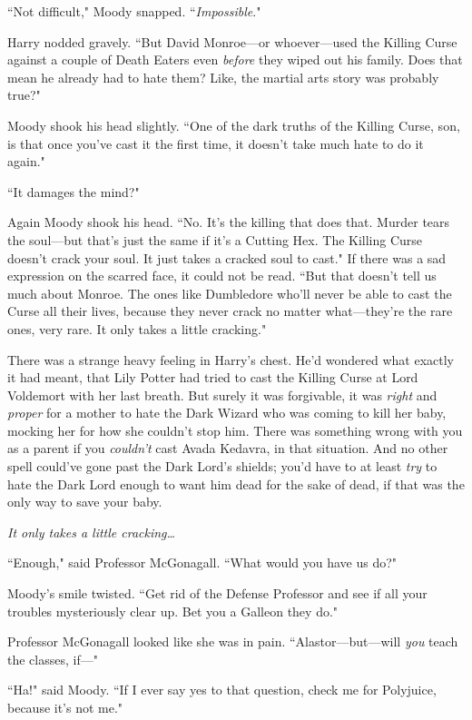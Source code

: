 ``Not difficult," Moody snapped. ``\emph{Impossible}."

Harry nodded gravely. ``But David Monroe—or whoever—used the Killing Curse against a couple of Death Eaters even \emph{before} they wiped out his family. Does that mean he already had to hate them? Like, the martial arts story was probably true?"

Moody shook his head slightly. ``One of the dark truths of the Killing Curse, son, is that once you've cast it the first time, it doesn't take much hate to do it again."

``It damages the mind?"

Again Moody shook his head. ``No. It's the killing that does that. Murder tears the soul—but that's just the same if it's a Cutting Hex. The Killing Curse doesn't crack your soul. It just takes a cracked soul to cast." If there was a sad expression on the scarred face, it could not be read. ``But that doesn't tell us much about Monroe. The ones like Dumbledore who'll never be able to cast the Curse all their lives, because they never crack no matter what—they're the rare ones, very rare. It only takes a little cracking."

There was a strange heavy feeling in Harry's chest. He'd wondered what exactly it had meant, that Lily Potter had tried to cast the Killing Curse at Lord Voldemort with her last breath. But surely it was forgivable, it was \emph{right} and \emph{proper} for a mother to hate the Dark Wizard who was coming to kill her baby, mocking her for how she couldn't stop him. There was something wrong with you as a parent if you \emph{couldn't} cast Avada Kedavra, in that situation. And no other spell could've gone past the Dark Lord's shields; you'd have to at least \emph{try} to hate the Dark Lord enough to want him dead for the sake of dead, if that was the only way to save your baby.

\emph{It only takes a little cracking{\ldots}}

``Enough," said Professor McGonagall. ``What would you have us do?"

Moody's smile twisted. ``Get rid of the Defense Professor and see if all your troubles mysteriously clear up. Bet you a Galleon they do."

Professor McGonagall looked like she was in pain. ``Alastor—but—will \emph{you} teach the classes, if—"

``Ha!" said Moody. ``If I ever say yes to that question, check me for Polyjuice, because it's not me."

